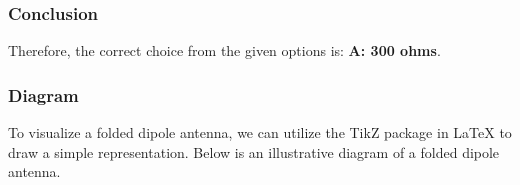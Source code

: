 \subsubsection{Conclusion}
Therefore, the correct choice from the given options is:
\textbf{A: 300 ohms}.

\subsubsection{Diagram}
To visualize a folded dipole antenna, we can utilize the TikZ package in LaTeX to draw a simple representation. Below is an illustrative diagram of a folded dipole antenna.

\begin{center}
\end{center}
